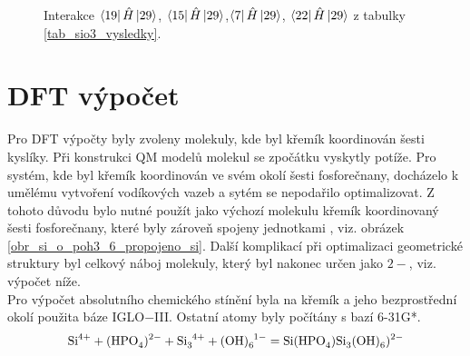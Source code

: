 \documentclass[
  digital, %
  table,   %
  lof,     %
  lot,     %
]{fithesis3}
\begin{document}
\begin{figure}
\begin{center}
{\label{obr_sio3_MO_35}}
\caption{Interakce $\bra{19}{\hat{H}}\ket{29}$, $\bra{15}{\hat{H}}\ket{29}$,$\bra{7}{\hat{H}}\ket{29}$, $\bra{22}{\hat{H}}\ket{29}$ z tabulky \ref{tab_sio3_vysledky}.}

\label{obr_sio3p_vysledky_I}\end{center}
\end{figure} 
  
\section{DFT výpočet} \label{kapitola_DFT}
Pro DFT výpočty byly zvoleny molekuly, kde byl křemík koordinován šesti kyslíky. Při konstrukci QM modelů molekul se zpočátku vyskytly potíže. Pro systém, kde byl křemík koordinován ve svém okolí šesti fosforečnany, docházelo k umělému vytvoření vodíkových vazeb a sytém se nepodařilo optimalizovat. Z tohoto důvodu bylo nutné použít jako výchozí molekulu křemík koordinovaný šesti fosforečnany, které byly zároveň spojeny jednotkami , viz. obrázek \ref{obr_si_o_poh3_6_propojeno_si}. Další komplikací při optimalizaci geometrické struktury byl celkový náboj molekuly, který byl nakonec určen jako $2-$, viz. výpočet níže. \\
Pro výpočet absolutního chemického stínění byla na křemík a jeho bezprostřední okolí použita báze IGLO$-$III. Ostatní atomy byly počítány s bazí 6-31G*. 
\begin{displaymath}
\ce{Si}^{4+} + \ce{(HPO4)^{2-}} + \ce{Si3^{4+}} + \ce{(OH)6^1-} = \ce{Si(HPO4)Si3(OH)6)^{2-}}
\end{displaymath}
\end{document}
